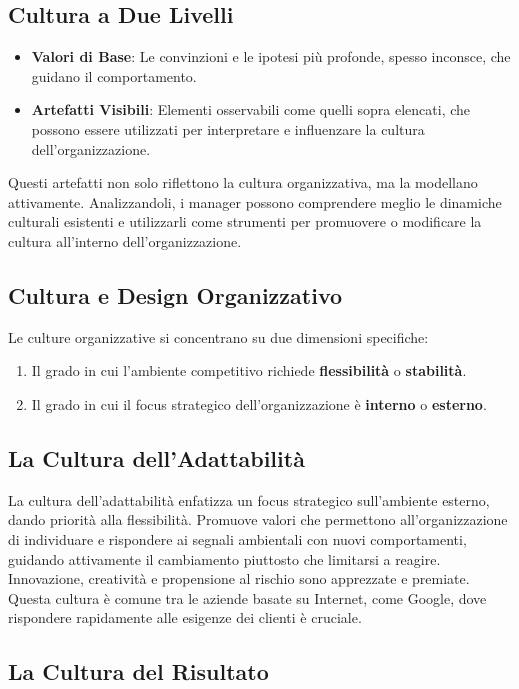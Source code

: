 \documentclass{article}
\begin{document}
\subsection{Cultura a Due Livelli}
\begin{itemize}
    \item \textbf{Valori di Base}: Le convinzioni e le ipotesi più profonde, spesso inconsce, che guidano il comportamento.
    \item \textbf{Artefatti Visibili}: Elementi osservabili come quelli sopra elencati, che possono essere utilizzati per interpretare e influenzare la cultura dell'organizzazione.
\end{itemize}

Questi artefatti non solo riflettono la cultura organizzativa, ma la modellano attivamente. Analizzandoli, i manager possono comprendere meglio le dinamiche culturali esistenti e utilizzarli come strumenti per promuovere o modificare la cultura all'interno dell'organizzazione.

\subsection{Cultura e Design Organizzativo}
Le culture organizzative si concentrano su due dimensioni specifiche:
\begin{enumerate}
    \item Il grado in cui l'ambiente competitivo richiede \textbf{flessibilità} o \textbf{stabilità}.
    \item Il grado in cui il focus strategico dell'organizzazione è \textbf{interno} o \textbf{esterno}.
\end{enumerate}


\subsection{La Cultura dell'Adattabilità}

La cultura dell'adattabilità enfatizza un focus strategico sull'ambiente esterno, dando priorità alla flessibilità. Promuove valori che permettono all'organizzazione di individuare e rispondere ai segnali ambientali con nuovi comportamenti, guidando attivamente il cambiamento piuttosto che limitarsi a reagire. Innovazione, creatività e propensione al rischio sono apprezzate e premiate. Questa cultura è comune tra le aziende basate su Internet, come Google, dove rispondere rapidamente alle esigenze dei clienti è cruciale.

\subsection{La Cultura del Risultato}
\end{document}
